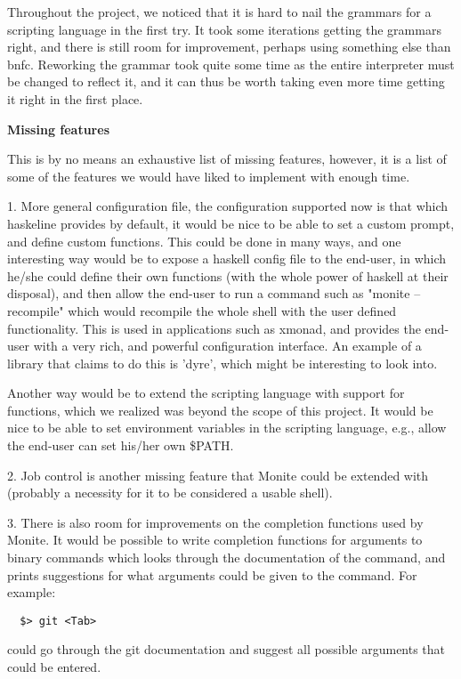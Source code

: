 \documentclass[11pt,a4paper]{article}
\begin{document}
Throughout the project, we noticed that it is hard to nail the grammars for a
scripting language in the first try. It took some iterations getting the
grammars right, and there is still room for improvement, perhaps using something
else than bnfc. Reworking the grammar took quite some time as the entire
interpreter must be changed to reflect it, and it can thus be worth taking even
more time getting it right in the first place.

\textbf{Missing features}

This is by no means an exhaustive list of missing features, however, it is a
list of some of the features we would have liked to implement with enough time.

1. More general configuration file, the configuration supported now is that
which haskeline provides by default, it would be nice to be able to set a custom
prompt, and define custom functions. This could be done in many ways, and one
interesting way would be to expose a haskell config file to the end-user, in
which he/she could define their own functions (with the whole power of haskell
at their disposal), and then allow the end-user to run a command such as "monite
--recompile" which would recompile the whole shell with the user defined
functionality. This is used in applications such as xmonad, and provides the
end-user with a very rich, and powerful configuration interface. An example of a
library that claims to do this is 'dyre', which might be interesting to look
into.

Another way would be to extend the scripting language with support for
functions, which we realized was beyond the scope of this project. It would be
nice to be able to set environment variables in the scripting language, e.g.,
allow the end-user can set his/her own \$PATH.

2. Job control is another missing feature that Monite could be extended with
(probably a necessity for it to be considered a usable shell).

3. There is also room for improvements on the completion functions used by
Monite.  It would be possible to write completion functions for arguments to
binary commands which looks through the documentation of the command, and prints
suggestions for what arguments could be given to the command. For example:

\begin{verbatim}
  $> git <Tab>
\end{verbatim}

could go through the git documentation and suggest all possible arguments that
could be entered.
\end{document}

